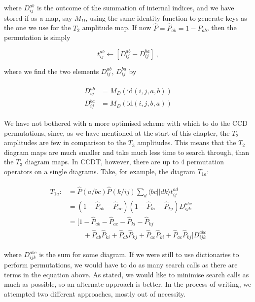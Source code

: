 \documentclass[10pt,twoside]{report}
\begin{document}
	where $D_{ij}^{ab}$ is the outcome of the summation of internal indices, and we have stored if as a map, say $M_D$, using the same identity function to generate keys as the one we use for the $T_2$ amplitude map. If now $\hat{P} = \hat{P}_{ab} = 1-P_{ab}$, then the permutation is simply
	
	\begin{equation}
		t_{ij}^{ab} \leftarrow \left[D_{ij}^{ab} - D_{ij}^{ba}\right] \:,
	\end{equation}
	
	where we find the two elements $D_{ij}^{ab}$, $D_{ij}^{ba}$ by
	
	\begin{align}
		\begin{split}
		D_{ij}^{ab} &= M_D\left(\text{id}(i,j,a,b)\right) \\
		D_{ij}^{ba} &= M_D\left(\text{id}(i,j,b,a)\right)
		\end{split}
	\end{align}
	
	We have not bothered with a more optimised scheme with which to do the CCD permutations, since, as we have mentioned at the start of this chapter, the $T_2$ amplitudes are few in comparison to the $T_3$ amplitudes. This means that the $T_2$ diagram maps are much smaller and take much less time to search through, than the $T_3$ diagram maps. In CCDT, however, there are up to 4 permutation operators on a single diagrams. Take, for example, the diagram $T_{1a}$:
	
	\begin{align}
		\begin{split}
		T_{1a} :&= \hat{P}(a/bc)\hat{P}(k/ij)\sum_d \langle bc|| dk\rangle t_{ij}^{ad} \\
		& = (1-\hat{P}_{ab} - \hat{P}_{ac})(1-\hat{P}_{ki}-\hat{P}_{kj})D_{ijk}^{abc} \\
		&= \big[1-\hat{P}_{ab}-\hat{P}_{ac}-\hat{P}_{ki}-\hat{P}_{kj} \\
		&\quad\quad\: + \hat{P}_{ab}\hat{P}_{ki} + \hat{P}_{ab}\hat{P}_{kj} + \hat{P}_{ac}\hat{P}_{ki} + \hat{P}_{ac}\hat{P}_{kj} \big]D_{ijk}^{abc}
		\end{split}
	\end{align}
	
	where $D_{ijk}^{abc}$ is the sum for some diagram. If we were still to use dictionaries to perform permutations, we would have to do as many search calls as there are terms in the equation above. As stated, we would like to minimise search calls as much as possible, so an alternate approach is better. In the process of writing, we attempted two different approaches, mostly out of necessity.\\
	
\end{document}
